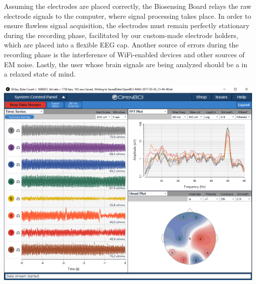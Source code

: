 \documentclass[landscape,final,a1paper,fontscale=0.4]{../baposter/baposter}
\begin{document}
\begin{poster}
{ Assuming the electrodes are placed correctly, the Biosensing Board relays the raw electrode signals to the computer, where signal processing takes place. In order to ensure flawless signal acquisition, the electrodes must remain perfectly stationary during the recording phase, facilitated by our custom-made electrode holders, which are placed into a flexible EEG cap. Another source of errors during the recording phase is the interference of WiFi-enabled devices and other sources of EM noise. Lastly, the user whose brain signals are being analyzed should be a in a relaxed state of mind.
	\begin{center}
 	\includegraphics[scale=0.28]{images/OpenBCI.png}
	\end{center}

  }

\end{poster}
\end{document}
